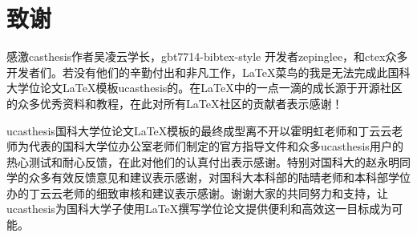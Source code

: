 \chapter[致谢]{致\quad 谢}%

感激casthesis作者吴凌云学长，gbt7714-bibtex-style
开发者zepinglee，和ctex众多开发者们。若没有他们的辛勤付出和非凡工作，\LaTeX{}菜鸟的我是无法完成此国科大学位论文\LaTeX{}模板ucasthesis的。在\LaTeX{}中的一点一滴的成长源于开源社区的众多优秀资料和教程，在此对所有\LaTeX{}社区的贡献者表示感谢！

ucasthesis国科大学位论文\LaTeX{}模板的最终成型离不开以霍明虹老师和丁云云老师为代表的国科大学位办公室老师们制定的官方指导文件和众多ucasthesis用户的热心测试和耐心反馈，在此对他们的认真付出表示感谢。特别对国科大的赵永明同学的众多有效反馈意见和建议表示感谢，对国科大本科部的陆晴老师和本科部学位办的丁云云老师的细致审核和建议表示感谢。谢谢大家的共同努力和支持，让ucasthesis为国科大学子使用\LaTeX{}撰写学位论文提供便利和高效这一目标成为可能。
